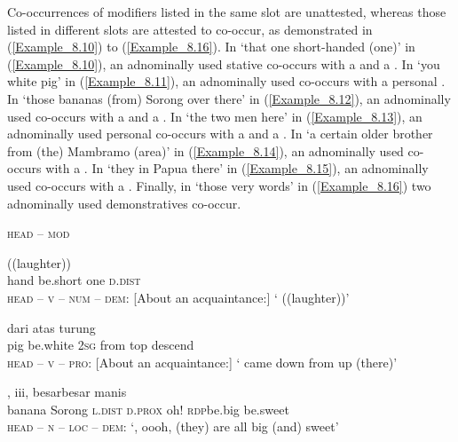Co-occurrences of modifiers listed in the same slot are unattested, whereas those listed in different slots are attested to co-occur, as demonstrated in (\ref{Example_8.10}) to (\ref{Example_8.16}). In  ‘that one short-handed (one)’ in (\ref{Example_8.10}), an adnominally used stative  co-occurs with a  and a . In  ‘you white pig’ in (\ref{Example_8.11}), an adnominally used  co-occurs with a personal . In  ‘those bananas (from) Sorong over there’ in (\ref{Example_8.12}), an adnominally used  co-occurs with a  and a . In  ‘the two men here’ in (\ref{Example_8.13}), an adnominally used personal  co-occurs with a  and a . In  ‘a certain older brother from (the) Mambramo (area)’ in (\ref{Example_8.14}), an adnominally used  co-occurs with a . In  ‘they in Papua there’ in (\ref{Example_8.15}), an adnominally used  co-occurs with a . Finally, in  ‘those very words’ in (\ref{Example_8.16}) two adnominally used demonstratives co-occur.



\begin{styleExampleTitle}
\textsc{head} – \textsc{mod}
\end{styleExampleTitle}
\ea
\label{Example_8.10}
 {} {} {} {((laughter))}\\ %
 hand  be.short  one  \textsc{d.dist}  \\
\glt 
\textsc{head} – \textsc{v} – \textsc{num} – \textsc{dem}: [About an acquaintance:] ‘ ((laughter))’ \textstyleExampleSource{[081006-016-Cv.0036]}
\z

\ea
\label{Example_8.11}
 {} {} {dari} {atas} {turung}\\ %
 pig  be.white  \textsc{2sg}  from  top  descend\\
\glt 
\textsc{head} – \textsc{v} – \textsc{pro}: [About an acquaintance:] ‘ came down from up (there)’ \textstyleExampleSource{[081025-006-Cv.0260]}
\z

\ea
\label{Example_8.12}
 {} {} {,} {iii,} {besar{\Tilde}besar} {manis}\\ %
 banana  Sorong  \textsc{l.dist}  \textsc{d.prox}  oh!  \textsc{rdp}{\Tilde}be.big  be.sweet\\
\glt 
\textsc{head} – \textsc{n} – \textsc{loc} – \textsc{dem}: ‘, oooh, (they) are all big (and) sweet’ \textstyleExampleSource{[081011-003-Cv.0017]}
\z


